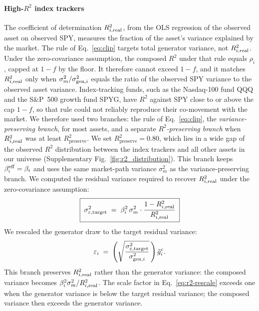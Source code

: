 \paragraph{High-$R^2$ index trackers}

The coefficient of determination $R^2_{i,\mathrm{real}}$, from the OLS
regression of the observed asset on observed SPY, measures the
fraction of the asset's variance explained by the market. The rule of
Eq.~\eqref{eq:clip} targets total generator variance, not
$R^2_{i,\mathrm{real}}$. Under the zero-covariance
assumption, the composed $R^2$ under that rule equals $\rho_i$, capped
at $1-f$ by the floor. It therefore cannot exceed $1-f$, and it matches $R^2_{i,\mathrm{real}}$ only
when $\sigma_m^2/\sigma_{\mathrm{gen},i}^2$ equals the ratio of the observed SPY
variance to the observed asset variance. Index-tracking funds, such as the Nasdaq-100 fund QQQ and the
S\&P~500 growth fund SPYG, have $R^2$ against SPY close to or above
the cap $1-f$, so that rule could not reliably reproduce their co-movement with the
market. We therefore used two branches: the rule of
Eq.~\eqref{eq:clip}, the \emph{variance-preserving branch}, for most
assets, and a separate \emph{$R^2$-preserving branch} when
$R^2_{i,\mathrm{real}}$ was at least $R^2_{\mathrm{preserve}}$. We set $R^2_{\mathrm{preserve}}=0.80$,
which lies in a wide gap of the observed $R^2$ distribution between
the index trackers and all other assets in our universe
(Supplementary Fig.~\ref{fig:r2_distribution}). This branch keeps $\beta_i^{\mathrm{eff}}=\beta_i$ and uses the same
market-path variance $\sigma_m^2$ as the variance-preserving branch.
We computed the residual variance required to recover $R^2_{i,\mathrm{real}}$
under the zero-covariance
assumption:
\begin{equation}
  \boxed{\;\sigma_{\varepsilon,\mathrm{target}}^2 \;=\; \beta_i^2\, \sigma_m^2 \cdot
    \frac{1 - R^2_{i,\mathrm{real}}}{R^2_{i,\mathrm{real}}}\;}
  \label{eq:r2-target}
\end{equation}
We rescaled the generator draw to the target residual variance:
\begin{equation}
  \varepsilon_i \;=\; \left(\sqrt{\frac{\sigma_{\varepsilon,\mathrm{target}}^2}{\sigma_{\mathrm{gen},i}^2}}\,\right)\tilde{g}_i^{\mathrm c}.
  \label{eq:r2-rescale}
\end{equation}
This branch preserves $R^2_{i,\mathrm{real}}$ rather than the generator
variance: the composed variance becomes
$\beta_i^2\sigma_m^2/R^2_{i,\mathrm{real}}$. The scale factor in Eq.~\eqref{eq:r2-rescale} exceeds one when the generator variance is below the target residual
variance; the composed variance then exceeds the generator variance.

